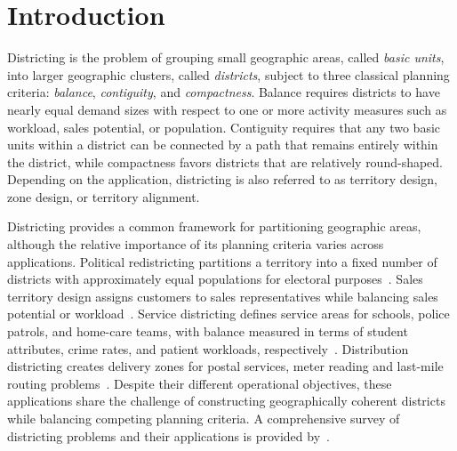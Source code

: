 \documentclass[11pt]{article}
\theoremstyle{definition}
\begin{document}
\setcounter{tocdepth}{2}
\tableofcontents


\section{Introduction}
\label{sec:intro}

Districting is the problem of grouping small geographic areas, called
\emph{basic units}, into larger geographic clusters, called \emph{districts}, 
subject to three classical planning criteria: \emph{balance}, \emph{contiguity}, 
and \emph{compactness}. Balance requires districts to have nearly equal demand sizes 
with respect to one or more activity measures such as workload, sales 
potential, or population. Contiguity requires that any two basic units within a 
district can be connected by a path that remains entirely within the district, 
while compactness favors districts that are relatively round-shaped. Depending on 
the application,  districting is also referred to as territory design, zone design, 
or territory alignment.


Districting provides a common framework for partitioning geographic areas, 
although the relative importance of its planning criteria varies across 
applications. Political redistricting partitions a territory into a fixed 
number of districts with approximately equal populations for electoral 
purposes~\citep{ricca2013political}. Sales territory design assigns customers 
to sales representatives while balancing sales potential or 
workload~\citep{kalcsics2005towards}. Service districting defines service areas 
for schools, police patrols, and home-care teams, with balance measured in terms 
of student attributes, crime rates, and patient workloads, 
respectively~\citep{blais2003solving, camacho2015multi, bouzarth2018assigning}. 
Distribution districting creates delivery zones for postal services, meter reading 
and last-mile routing problems~\citep{ramirez2023reconfiguration, de2014redistricting, 
sandoval2022novel}. Despite their different operational objectives, these 
applications share the challenge of constructing geographically coherent districts 
while balancing competing planning criteria. A comprehensive survey of districting 
problems and their applications is provided by~\citet{CAMPOSVALDES2026103654}.
\end{document}
